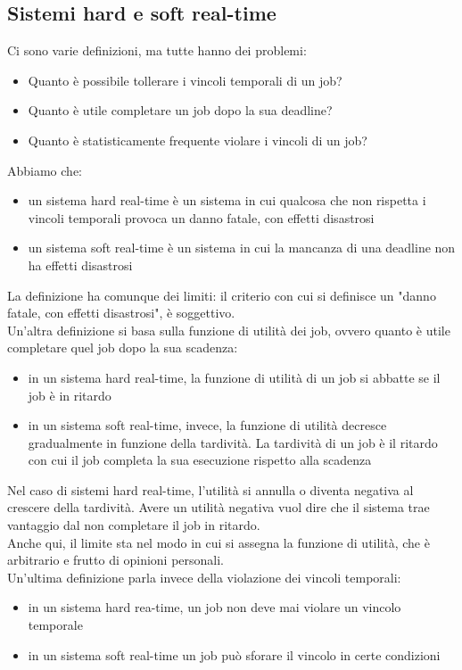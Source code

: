 \documentclass[12pt, oneside]{extbook}
\begin{document}
\subsection{Sistemi hard e soft real-time}
Ci sono varie definizioni, ma tutte hanno dei problemi:
\begin{itemize}
\item Quanto è possibile tollerare i vincoli temporali di un job?
\item Quanto è utile completare un job dopo la sua deadline?
\item Quanto è statisticamente frequente violare i vincoli di un job?
\end{itemize}
Abbiamo che:
\begin{itemize}
\item un sistema hard real-time è un sistema in cui qualcosa che non rispetta i vincoli temporali provoca un danno fatale, con effetti disastrosi
\item un sistema soft real-time è un sistema in cui la mancanza di una deadline non ha effetti disastrosi
\end{itemize}
La definizione ha comunque dei limiti: il criterio con cui si definisce un "danno fatale, con effetti disastrosi", è soggettivo.\\ Un'altra definizione si basa sulla funzione di utilità dei job, ovvero quanto è utile completare quel job dopo la sua scadenza:
\begin{itemize}
\item in un sistema hard real-time, la funzione di utilità di un job si abbatte se il job è in ritardo
\item in un sistema soft real-time, invece, la funzione di utilità decresce gradualmente in funzione della tardività. La tardività di un job è il ritardo con cui il job completa la sua esecuzione rispetto alla scadenza
\end{itemize}
Nel caso di sistemi hard real-time, l'utilità si annulla o diventa negativa al crescere della tardività. Avere un utilità negativa vuol dire che il sistema trae vantaggio dal non completare il job in ritardo.\\ Anche qui, il limite sta nel modo in cui si assegna la funzione di utilità, che è arbitrario e frutto di opinioni personali.\\ Un'ultima definizione parla invece della violazione dei vincoli temporali:
\begin{itemize}
\item in un sistema hard rea-time, un job non deve mai violare un vincolo temporale
\item in un sistema soft real-time un job può sforare il vincolo in certe condizioni
\end{itemize}
\end{document}
